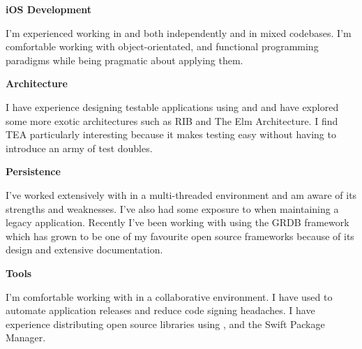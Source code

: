 \textbf{iOS Development}

I'm experienced working in  and  both
independently and in mixed codebases. I'm comfortable working with
object-orientated,  and functional programming
paradigms while being pragmatic about applying them.

\smallskip

\textbf{Architecture}

I have experience designing testable applications using  and
 and have explored some more exotic architectures such as RIB and
The Elm Architecture. I find TEA particularly interesting because it makes
testing easy without having to introduce an army of test doubles.

\smallskip

\textbf{Persistence}

I've worked extensively with  in a multi-threaded environment
and am aware of its strengths and weaknesses. I've also had some exposure to
 when maintaining a legacy application. Recently I've been working
with  using the GRDB framework which has grown to be one of my
favourite open source frameworks because of its design and extensive
documentation.

\smallskip

\textbf{Tools}

I'm comfortable working with  in a collaborative environment. I have
used  to automate application releases and reduce code signing
headaches. I have experience distributing open source libraries using
,  and the Swift Package Manager.

